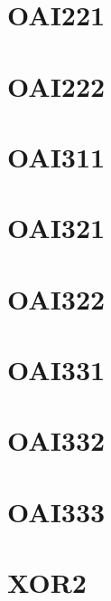 \documentclass[10pt,a4paper,twoside]{article}
\begin{document}
\section{OAI221}

\clearpage

\section{OAI222}

\clearpage

\section{OAI311}

\clearpage

\section{OAI321}

\clearpage

\section{OAI322}

\clearpage

\section{OAI331}

\clearpage

\section{OAI332}

\clearpage

\section{OAI333}

\clearpage


\section{XOR2}

\clearpage
\end{document}
